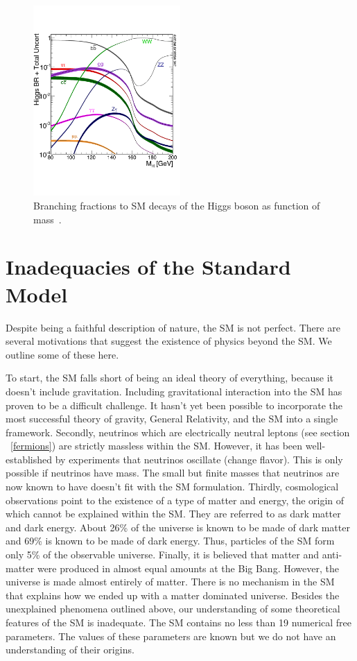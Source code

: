 \begin{figure}[hbtp]
 \begin{center}
   \includegraphics[width=0.5\textwidth]{plots_and_figures/chapter2/higgs_decays.pdf}
   \caption{Branching fractions to SM decays of the Higgs boson as function of mass~\cite{hg_decay}.}
   \label{fig:higs_decays}
 \end{center}
\end{figure}

\section{Inadequacies of the Standard Model}
Despite being a faithful description of nature, the SM is not perfect. There are several motivations that suggest the existence of physics beyond the SM. We outline some of these here.

To start, the SM falls short of being an ideal theory of everything, because it doesn't include gravitation. Including gravitational interaction into the SM has proven to be a difficult challenge. It hasn't yet been possible to incorporate the most successful theory of gravity, General Relativity, and the SM into a single framework. Secondly, neutrinos which are electrically neutral leptons (see section ~\ref{fermions}) are strictly massless within the SM. However, it has been well-established by experiments that neutrinos oscillate (change flavor). This is only possible if neutrinos have mass. The small but finite masses that neutrinos are now known to have doesn't fit with the SM formulation. Thirdly, cosmological observations point to the existence of a type of matter and energy, the origin of which cannot be explained within the SM. They are referred to as dark matter and dark energy. About 26\% of the universe is known to be made of dark matter and 69\% is known to be made of dark energy. Thus, particles of the SM form only 5\% of the observable universe. Finally, it is believed that matter and anti-matter were produced in almost equal amounts at the Big Bang. However, the universe is made almost entirely of matter. There is no mechanism in the SM that explains how we ended up with a matter dominated universe. Besides the unexplained phenomena outlined above, our understanding of some theoretical features of the SM is inadequate. The SM contains no less than 19 numerical free parameters. The values of these parameters are known but we do not have an understanding of their origins.

